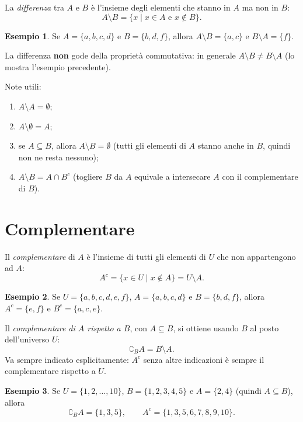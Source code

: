 \documentclass[11pt,a4paper]{article}
\theoremstyle{definition}
\newtheorem*{esempio}{Esempio}
\begin{document}
\begin{definizione}
La \emph{differenza} tra $A$ e $B$ è l'insieme degli elementi che
stanno in $A$ ma non in $B$:
\[
A \setminus B = \{x \mid x \in A \text{ e } x \notin B\}.
\]
\end{definizione}

\begin{esempio}
Se $A = \{a, b, c, d\}$ e $B = \{b, d, f\}$, allora
$A \setminus B = \{a, c\}$ e $B \setminus A = \{f\}$.
\end{esempio}

La differenza \textbf{non} gode della proprietà commutativa: in generale
$A \setminus B \neq B \setminus A$ (lo mostra l'esempio precedente).

Note utili:
\begin{enumerate}
    \item $A \setminus A = \emptyset$;
    \item $A \setminus \emptyset = A$;
    \item se $A \subseteq B$, allora $A \setminus B = \emptyset$
          (tutti gli elementi di $A$ stanno anche in $B$, quindi non ne
          resta nessuno);
    \item $A \setminus B = A \cap B^c$ (togliere $B$ da $A$ equivale a
          intersecare $A$ con il complementare di $B$).
\end{enumerate}

\section{Complementare}

\begin{definizione}
Il \emph{complementare} di $A$ è l'insieme di tutti gli elementi di $U$
che non appartengono ad $A$:
\[
A^c = \{x \in U \mid x \notin A\} = U \setminus A.
\]
\end{definizione}

\begin{esempio}
Se $U = \{a, b, c, d, e, f\}$, $A = \{a, b, c, d\}$ e $B = \{b, d, f\}$,
allora $A^c = \{e, f\}$ e $B^c = \{a, c, e\}$.
\end{esempio}

Il \emph{complementare di $A$ rispetto a $B$}, con $A \subseteq B$, si
ottiene usando $B$ al posto dell'universo $U$:
\[
\complement_B A = B \setminus A.
\]
Va sempre indicato esplicitamente: $A^c$ senza altre indicazioni è sempre
il complementare rispetto a $U$.

\begin{esempio}
Se $U = \{1, 2, \dots, 10\}$, $B = \{1, 2, 3, 4, 5\}$ e $A = \{2, 4\}$
(quindi $A \subseteq B$), allora
\[
\complement_B A = \{1, 3, 5\}, \qquad A^c = \{1, 3, 5, 6, 7, 8, 9, 10\}.
\]
\end{esempio}
\end{document}
